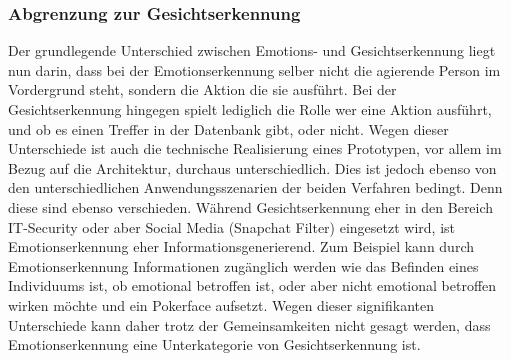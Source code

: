 \documentclass[12pt, a4paper]{report}
\begin{document}
\subsubsection{Abgrenzung zur Gesichtserkennung}
Der grundlegende Unterschied zwischen Emotions- und Gesichtserkennung liegt nun darin, dass bei der Emotionserkennung selber nicht die agierende Person im Vordergrund steht, sondern die Aktion die sie ausführt.
Bei der Gesichtserkennung hingegen spielt lediglich die Rolle wer eine Aktion ausführt, und ob es einen Treffer in der Datenbank gibt, oder nicht. Wegen dieser Unterschiede ist auch die technische Realisierung eines Prototypen, vor allem im Bezug auf die Architektur,  durchaus unterschiedlich. Dies ist jedoch ebenso von den unterschiedlichen Anwendungsszenarien der beiden Verfahren bedingt.
 Denn diese sind ebenso verschieden. Während Gesichtserkennung eher in den Bereich IT-Security oder aber Social Media (Snapchat Filter) eingesetzt wird, ist Emotionserkennung eher Informationsgenerierend.
Zum Beispiel kann durch Emotionserkennung Informationen zugänglich werden wie das Befinden eines Individuums ist, ob emotional betroffen ist, oder aber nicht emotional betroffen wirken möchte und ein Pokerface aufsetzt.
Wegen dieser signifikanten Unterschiede kann daher trotz der Gemeinsamkeiten nicht gesagt werden, dass Emotionserkennung eine Unterkategorie von Gesichtserkennung ist.
\end{document}
